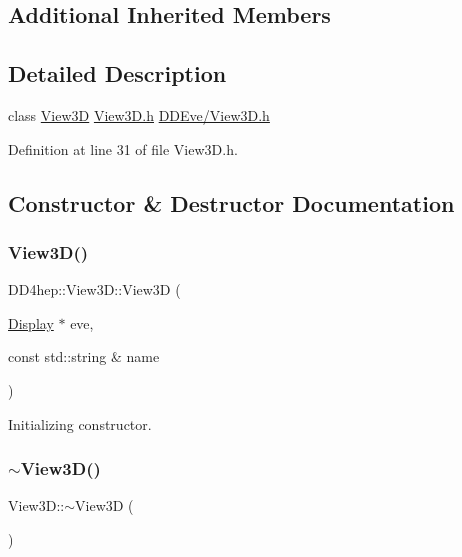 \subsection*{Additional Inherited Members}


\subsection{Detailed Description}
class \hyperlink{class_d_d4hep_1_1_view3_d}{View3D} \hyperlink{_view3_d_8h}{View3\+D.\+h} \hyperlink{_view3_d_8h}{D\+D\+Eve/\+View3\+D.\+h} 

Definition at line 31 of file View3\+D.\+h.



\subsection{Constructor \& Destructor Documentation}
\hypertarget{class_d_d4hep_1_1_view3_d_aec5a272c7c13401f3c40cf51170b9ace}{}\label{class_d_d4hep_1_1_view3_d_aec5a272c7c13401f3c40cf51170b9ace} 
\subsubsection{\texorpdfstring{View3\+D()}{View3D()}}
{\footnotesize\ttfamily D\+D4hep\+::\+View3\+D\+::\+View3D (\begin{DoxyParamCaption}\item[{\hyperlink{class_d_d4hep_1_1_display}{Display} $\ast$}]{eve,  }\item[{const std\+::string \&}]{name }\end{DoxyParamCaption})}



Initializing constructor. 

\hypertarget{class_d_d4hep_1_1_view3_d_a54e79a96844ebb7e5337622cf65188aa}{}\label{class_d_d4hep_1_1_view3_d_a54e79a96844ebb7e5337622cf65188aa} 
\subsubsection{\texorpdfstring{$\sim$\+View3\+D()}{~View3D()}}
{\footnotesize\ttfamily View3\+D\+::$\sim$\+View3D (\begin{DoxyParamCaption}{ }\end{DoxyParamCaption})\hspace{0.3cm}{\ttfamily [virtual]}}



